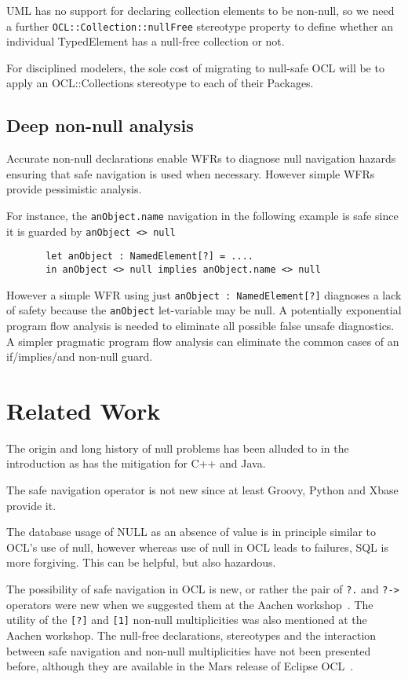 \documentclass{llncs}
\begin{document}
UML has no support for declaring collection elements to be non-null, so we need a further \verb$OCL::Collection::nullFree$ stereotype property to define whether an individual TypedElement has a null-free collection or not.

For disciplined modelers, the sole cost of migrating to null-safe OCL will be to apply an OCL::Collections stereotype to each of their Packages.

\subsection{Deep non-null analysis}

Accurate non-null declarations enable WFRs to diagnose null navigation hazards ensuring that safe navigation is used when necessary. However simple WFRs provide pessimistic analysis.

For instance, the \verb$anObject.name$ navigation in the following example is safe since it is guarded by \verb$anObject <> null$

\begin{verbatim}
       let anObject : NamedElement[?] = .... 
       in anObject <> null implies anObject.name <> null
\end{verbatim}

However a simple WFR using just \verb$anObject : NamedElement[?]$ diagnoses a lack of safety because the \verb$anObject$ let-variable may be null. A potentially exponential program flow analysis is needed to eliminate all possible false unsafe diagnostics. A simpler pragmatic program flow analysis can eliminate the common cases of an if/implies/and non-null guard.

\section{Related Work}\label{Related Work}

The origin and long history of null problems has been alluded to in the introduction as has the mitigation for C++ and Java.

The safe navigation operator is not new since at least Groovy, Python and Xbase provide it.

The database usage of  NULL as an absence of value is in principle similar to OCL's use of null, however whereas use of null in OCL leads to failures, SQL is more forgiving. This can be helpful, but also hazardous.

The possibility of safe navigation in OCL is new, or rather the pair of \verb$?.$ and \verb$?->$ operators were new when we suggested them at the Aachen workshop~\cite{aachen}. The utility of the \verb$[?]$ and \verb$[1]$ non-null multiplicities was also mentioned at the Aachen workshop. The null-free declarations, stereotypes and the interaction between safe navigation and non-null multiplicities have not been presented before, although they are available in the Mars release of Eclipse OCL~\cite{Mars-OCL}. 
%
\end{document}
